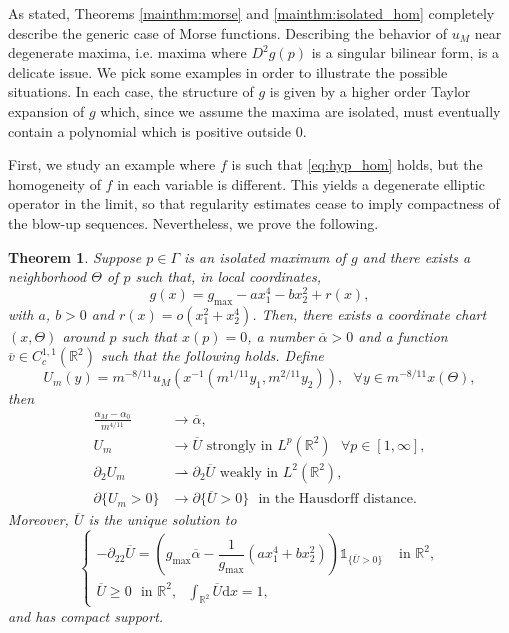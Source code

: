 \documentclass[10pt,a4paper]{article}
\newcommand{\gmax}{g_{\mathrm{max}}}
\newcommand{\RR}{\mathbb{R}}
\newcommand{\faskip}{\hspace{8pt}}
\newtheorem{mainthm}{Theorem}
\numberwithin{equation}{section}
\begin{document}
As stated, Theorems \ref{mainthm:morse} and \ref{mainthm:isolated_hom} completely describe the generic case of Morse functions. Describing the behavior of $ u_M $ near degenerate maxima, i.e. maxima where $D^2 g(p)$ is a singular bilinear form, is a delicate issue. We pick some examples in order to illustrate the possible situations. In each case, the structure of $ g $ is given by a higher order Taylor expansion of $ g $ which, since we assume the maxima are isolated, must eventually contain a polynomial which is positive outside $ 0 $. 

First, we study an example where $ f $ is such that \eqref{eq:hyp_hom} holds, but the homogeneity of $ f $ in each variable is different. This yields a degenerate elliptic operator in the limit, so that regularity estimates cease to imply compactness of the blow-up sequences. Nevertheless, we prove the following.
\begin{mainthm}
	\label{mainthm:inhom}
	Suppose $ p \in \Gamma $ is an isolated maximum of $ g $ and there exists a neighborhood $ \Theta $ of $ p $ such that, in local coordinates,
	\begin{equation}
		\label{eq:inhom_g}
		g(x) = \gmax - ax_1^{4} - bx_2^{2} + r(x),
	\end{equation}
with $ a $, $ b >0 $ and $ r(x) = o(x_1^{2} + x_2^{4}) $. Then, there exists a coordinate chart $ (x,\Theta) $ around $ p $ such that $x(p) = 0$, a number $\overline{\alpha} > 0$ and a function $ \overline{v} \in C_c^{1,1}(\RR^{2}) $ such that the following holds. Define 
	\[
		U_{m}(y) = m^{-8/11} u_M(x^{-1}(m^{1/11} y_1, m^{2/11} y_2)), \faskip \forall y\in m^{-8/11} x(\Theta),
	\]
	then
	\begin{align*}
		\frac{\alpha_M - \alpha_0}{m^{4/11}} &\rightarrow \overline{\alpha}, \\
		U_{m} &\rightarrow \overline{U} \text{ strongly in } L^{p}(\RR^{2}) \faskip \forall p\in [1,\infty], \\
		\partial_2 U_{m} &\rightharpoonup \partial_2 \overline{U} \text{ weakly in } L^{2}(\RR^{2}), \\
		\partial \{U_m > 0\} &\rightarrow \partial \{\overline{U} > 0\} \faskip \text{in the Hausdorff distance.}
	\end{align*}
	Moreover, $ \overline{U} $ is the unique solution to 
	\[
	\begin{cases}
		-\partial_{22} \overline{U} = \left( \gmax \overline{\alpha} -\dfrac{1}{\gmax}( a x_1^{4} + b x_2^{2}) \right)\mathbb{1}_{\{ \overline{U} > 0 \}} & \text{ in }\RR^{2}, \\ 
		\overline{U} \geq 0 \faskip \text{in }\RR^{2}, \faskip \displaystyle \int_{\RR^{2}} \overline{U} \mathrm{d}x  = 1, 	& 
	\end{cases}	
	\]
	and has compact support.
\end{mainthm}
\end{document}
